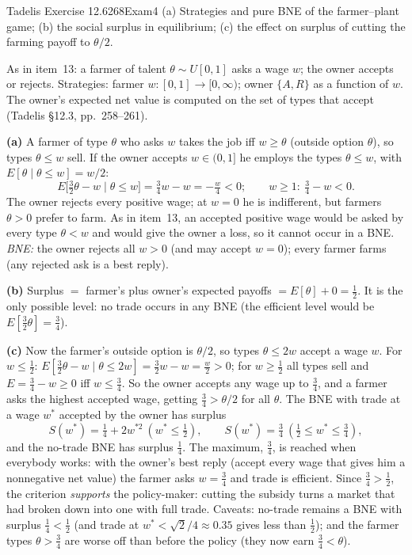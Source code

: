 \begin{exsol}{Tadelis Exercise 12.6}{268}{Exam}{4}
\asked (a) Strategies and pure BNE of the farmer--plant game; (b) the social surplus in
equilibrium; (c) the effect on surplus of cutting the farming payoff to $\theta/2$.

\method As in item~13: a farmer of talent $\theta\sim U[0,1]$ asks a wage $w$; the owner accepts
or rejects. Strategies: farmer $w:[0,1]\to[0,\infty)$; owner $\{A,R\}$ as a function of $w$.
The owner's expected net value is computed on the set of types that accept
(Tadelis \S12.3, pp.~258--261).

\solution
\textbf{(a)} A farmer of type $\theta$ who asks $w$ takes the job iff $w\ge\theta$ (outside
option $\theta$), so types $\theta\le w$ sell. If the owner accepts $w\in(0,1]$ he employs the
types $\theta\le w$, with $E[\theta\mid\theta\le w]=w/2$:
\[
  E\bigl[\tfrac32\theta-w\mid\theta\le w\bigr]=\tfrac34w-w=-\tfrac w4<0 ;\qquad
  w\ge1:\ \tfrac34-w<0 .
\]
The owner rejects every positive wage; at $w=0$ he is indifferent, but farmers $\theta>0$ prefer
to farm. As in item~13, an accepted positive wage would be asked by every type $\theta<w$ and
would give the owner a loss, so it cannot occur in a BNE. \emph{BNE:} the owner rejects all
$w>0$ (and may accept $w=0$); every farmer farms (any rejected ask is a best reply).

\textbf{(b)} Surplus $=$ farmer's plus owner's expected payoffs $=E[\theta]+0=\tfrac12$. It is the
only possible level: no trade occurs in any BNE (the efficient level would be $E[\tfrac32\theta]=\tfrac34$).

\textbf{(c)} Now the farmer's outside option is $\theta/2$, so types $\theta\le2w$ accept a wage $w$.
For $w\le\tfrac12$: $E[\tfrac32\theta-w\mid\theta\le2w]=\tfrac32w-w=\tfrac w2>0$; for $w\ge\tfrac12$
all types sell and $E=\tfrac34-w\ge0$ iff $w\le\tfrac34$. So the owner accepts any wage up to
$\tfrac34$, and a farmer asks the highest accepted wage, getting $\tfrac34>\theta/2$ for all $\theta$.
The BNE with trade at a wage $w^*$ accepted by the owner has surplus
\[
  S(w^*)=\tfrac14+2w^{*2}\ (w^*\le\tfrac12),\qquad S(w^*)=\tfrac34\ (\tfrac12\le w^*\le\tfrac34),
\]
and the no-trade BNE has surplus $\tfrac14$. The maximum, $\tfrac34$, is reached when everybody
works: with the owner's best reply (accept every wage that gives him a nonnegative net value) the
farmer asks $w=\tfrac34$ and trade is efficient. Since $\tfrac34>\tfrac12$, the criterion
\emph{supports} the policy-maker: cutting the subsidy turns a market that had broken down into
one with full trade. Caveats: no-trade remains a BNE with surplus $\tfrac14<\tfrac12$ (and trade
at $w^*<\sqrt2/4\approx0.35$ gives less than $\tfrac12$); and the farmer types $\theta>\tfrac34$ are
worse off than before the policy (they now earn $\tfrac34<\theta$).


\end{exsol}
